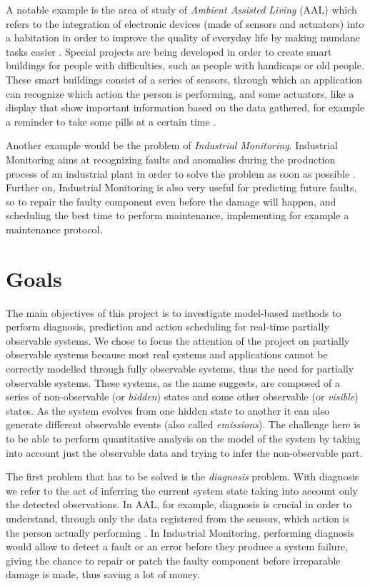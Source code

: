 \documentclass{article}
\begin{document}
        A notable example is the area of study of \textit{Ambient Assisted Living} (AAL) which refers to the integration of electronic devices (made of sensors and actuators) into a habitation in order to improve the quality of everyday life by making mundane tasks easier \cite{cook2009ambient}. Special projects are being developed in order to create smart buildings for people with difficulties, such as people with handicaps or old people. These smart buildings consist of a series of sensors, through which an application can recognize which action the person is performing, and some actuators, like a display that show important information based on the data gathered, for example a reminder to take some pills at a certain time \cite{qest15, epew16}.
        
        Another example would be the problem of \textit{Industrial Monitoring}. Industrial Monitoring aims at recognizing faults and anomalies during the production process of an industrial plant in order to solve the problem as soon as possible \cite{chiang2001fault}. Further on, Industrial Monitoring is also very useful for predicting future faults, so to repair the faulty component even before the damage will happen, and scheduling the best time to perform maintenance, implementing for example a maintenance protocol.
        
    \section*{Goals}
    
        The main objectives of this project is to investigate model-based methods to perform diagnosis, prediction and action scheduling for real-time partially observable systems. We chose to focus the attention of the project on partially observable systems because most real systems and applications cannot be correctly modelled through fully observable systems, thus the need for partially observable systems. These systems, as the name suggests, are composed of a series of non-observable (or \textit{hidden}) states and some other observable (or \textit{visible}) states. As the system evolves from one hidden state to another it can also generate different observable events (also called \textit{emissions}). The challenge here is to be able to perform quantitative analysis on the model of the system by taking into account just the observable data and trying to infer the non-observable part.
        
        The first problem that has to be solved is the \textit{diagnosis} problem. With diagnosis we refer to the act of inferring the current system state taking into account only the detected observations. In AAL, for example, diagnosis is crucial in order to understand, through only the data registered from the sensors, which action is the person actually performing \cite{qest15}. In Industrial Monitoring, performing diagnosis would allow to detect a fault or an error before they produce a system failure, giving the chance to repair or patch the faulty component before irreparable damage is made, thus saving a lot of money.
        
\end{document}

